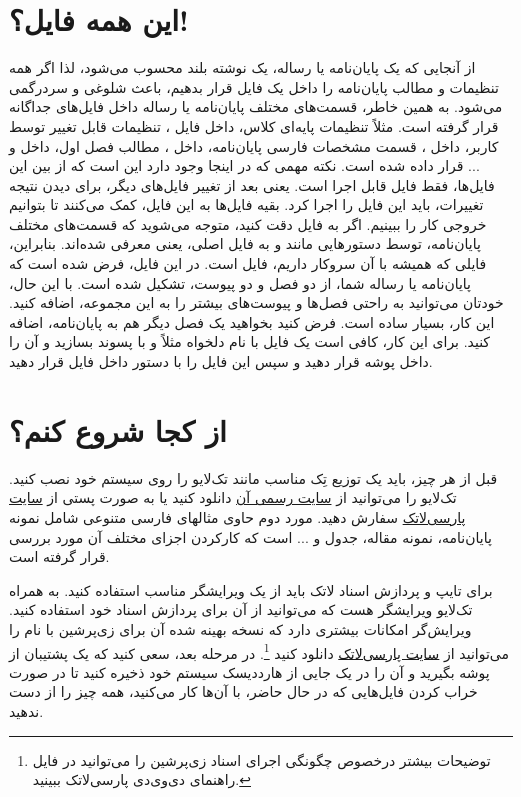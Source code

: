 \section{این همه فایل؟!}\label{sec2}
از آنجایی که یک پایان‌نامه یا رساله، یک نوشته بلند محسوب می‌شود، لذا اگر همه تنظیمات و مطالب پایان‌نامه را داخل یک فایل قرار بدهیم، باعث شلوغی
و سردرگمی می‌شود. به همین خاطر، قسمت‌های مختلف پایان‌نامه یا رساله  داخل فایل‌های جداگانه قرار گرفته است. مثلاً تنظیمات پایه‌ای کلاس، داخل فایل
، 
تنظیمات قابل تغییر توسط کاربر، داخل 
،
قسمت مشخصات فارسی پایان‌نامه، داخل 
،
مطالب فصل اول، داخل 
و ... قرار داده شده است. نکته مهمی که در اینجا وجود دارد این است که از بین این  فایل‌ها، فقط فایل 
قابل اجرا است. یعنی بعد از تغییر فایل‌های دیگر، برای دیدن نتیجه تغییرات، باید این فایل را اجرا کرد. بقیه فایل‌ها به این فایل، کمک می‌کنند تا بتوانیم خروجی کار را ببینیم. اگر به فایل 
دقت کنید، متوجه می‌شوید که قسمت‌های مختلف پایان‌نامه، توسط دستورهایی مانند 
و
به فایل اصلی، یعنی 
معرفی شده‌اند. بنابراین، فایلی که همیشه با آن سروکار داریم، فایل 
است.
در این فایل، فرض شده است که پایان‌نامه یا رساله شما، از دو فصل و دو پیوست، تشکیل شده است. با این حال، خودتان می‌توانید به راحتی فصل‌ها و پیوست‌های بیشتر را به این مجموعه، اضافه کنید. این کار، بسیار ساده است. فرض کنید بخواهید یک فصل دیگر هم به پایان‌نامه، اضافه کنید. برای این کار، کافی است یک فایل با نام دلخواه مثلاً 
و با پسوند 
بسازید و آن را داخل پوشه 
قرار دهید و سپس این فایل را با دستور 
\verb!!
داخل فایل
 قرار دهید.

\section{از کجا شروع کنم؟}
قبل از هر چیز، باید یک توزیع تِک مناسب مانند تک‌لایو
را روی سیستم خود نصب کنید. تک‌لایو  را می‌توانید از 
 \href{http://www.tug.org/texlive}{سایت رسمی آن}%
 دانلود کنید یا به صورت پستی از 
 \href{http://www.parsilatex.com}{سایت پارسی‌لاتک}%
سفارش دهید. مورد دوم حاوی مثالهای فارسی متنوعی شامل نمونه پایان‌نامه، نمونه مقاله، جدول و ... است که کارکردن اجزای مختلف آن مورد بررسی قرار گرفته است.

برای تایپ و پردازش اسناد لاتک باید از یک ویرایشگر مناسب استفاده کنید. به همراه تک‌لایو ویرایشگر  هست که می‌توانید از آن برای پردازش اسناد خود استفاده کنید. 
ویرایش‌گر 
امکانات بیشتری دارد که نسخه بهینه شده آن برای زی‌پرشین با نام   را می‌توانید  از 
 \href{http://www.parsilatex.com}{سایت پارسی‌لاتک} 
 دانلود کنید
 \footnote{توضیحات بیشتر درخصوص چگونگی اجرای اسناد زی‌پرشین را می‌توانید در فایل راهنمای دی‌وی‌دی پارسی‌لاتک ببینید.}.
در مرحله بعد، سعی کنید که  یک پشتیبان از پوشه 
 بگیرید و آن را در یک جایی از هارددیسک سیستم خود ذخیره کنید تا در صورت خراب کردن فایل‌هایی که در حال حاضر، با آن‌ها کار می‌کنید، همه چیز را از 
 دست ندهید.
 
